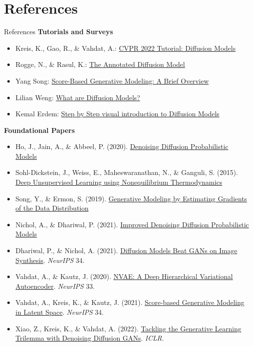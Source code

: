 \section{References}
\begin{frame}[allowframebreaks]{References}
\textbf{Tutorials and Surveys}
\begin{itemize}
    \item Kreis, K., Gao, R., \& Vahdat, A.: \href{https://cvpr2022-tutorial-diffusion-models.github.io/}{CVPR 2022 Tutorial: Diffusion Models}
    \item Rogge, N., \& Rasul, K.: \href{https://huggingface.co/blog/annotated-diffusion}{The Annotated Diffusion Model}
    \item Yang Song: \href{https://yang-song.github.io/blog/2021/score/}{Score-Based Generative Modeling: A Brief Overview}
    \item Lilian Weng: \href{https://lilianweng.github.io/posts/2021-07-11-diffusion-models/}{What are Diffusion Models?}
    \item Kemal Erdem: \href{https://erdem.pl/2023/11/step-by-step-visual-introduction-to-diffusion-models/}{Step by Step visual introduction to Diffusion Models}
\end{itemize}

\framebreak

\textbf{Foundational Papers}
\begin{itemize}
    \item Ho, J., Jain, A., \& Abbeel, P. (2020). \href{https://arxiv.org/abs/2006.11239}{Denoising Diffusion Probabilistic Models}
    \item Sohl-Dickstein, J., Weiss, E., Maheswaranathan, N., \& Ganguli, S. (2015). \href{https://arxiv.org/abs/1503.03585}{Deep Unsupervised Learning using Nonequilibrium Thermodynamics}
    \item Song, Y., \& Ermon, S. (2019). \href{https://arxiv.org/abs/1907.05600}{Generative Modeling by Estimating Gradients of the Data Distribution}
    \item Nichol, A., \& Dhariwal, P. (2021). \href{https://arxiv.org/abs/2102.09672}{Improved Denoising Diffusion Probabilistic Models}
    \item Dhariwal, P., \& Nichol, A. (2021). \href{https://arxiv.org/abs/2105.05233}{Diffusion Models Beat GANs on Image Synthesis}. \emph{NeurIPS} 34.
    \item Vahdat, A., \& Kautz, J. (2020). \href{https://arxiv.org/abs/2007.03898}{NVAE: A Deep Hierarchical Variational Autoencoder}. \emph{NeurIPS} 33.
    \item Vahdat, A., Kreis, K., \& Kautz, J. (2021). \href{https://arxiv.org/abs/2106.05931}{Score-based Generative Modeling in Latent Space}. \emph{NeurIPS} 34.
    \item Xiao, Z., Kreis, K., \& Vahdat, A. (2022). \href{https://arxiv.org/abs/2112.07804}{Tackling the Generative Learning Trilemma with Denoising Diffusion GANs}. \emph{ICLR}.
\end{itemize}


\end{frame}
